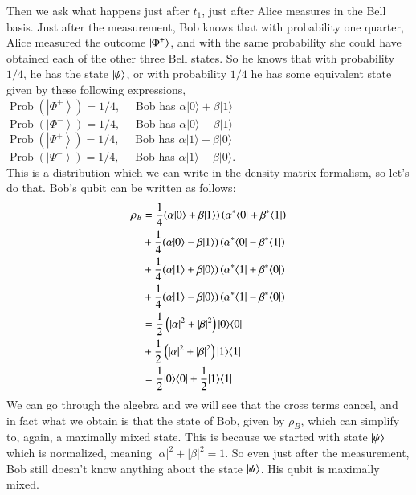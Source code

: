 Then we ask what happens just after $t_1$, just after Alice measures in the Bell basis. Just after the measurement, Bob knows that with probability one quarter, Alice measured the outcome $\left| \Phi^+ \right\rangle$, and with the same probability she could have obtained each of the other three  Bell states. So he knows that with probability $1/4$, he has the state $\left| \psi \right\rangle$, or with probability $1/4$ he has some equivalent state given by these following expressions,\\
$\operatorname{Prob}\left(\left|\Phi^{+}\right\rangle\right)=1 / 4, \quad$ Bob has $\alpha|0\rangle+\beta|1\rangle$\\
$\operatorname{Prob}\left(\left|\Phi^{-}\right\rangle\right)=1 / 4, \quad$ Bob has $\alpha|0\rangle-\beta|1\rangle$\\
$\operatorname{Prob}\left(\left|\Psi^{+}\right\rangle\right)=1 / 4, \quad$ Bob has $\alpha|1\rangle+\beta|0\rangle$\\
$\operatorname{Prob}\left(\left|\Psi^{-}\right\rangle\right)=1 / 4, \quad$ Bob has $\alpha|1\rangle-\beta|0\rangle$.\\

This is a distribution which we can write in the density matrix formalism, so let's do that. Bob's qubit can be written as follows:
\begin{equation}
\begin{aligned}
\rho_B &=\frac{1}{4}(\alpha|0\rangle+\beta|1\rangle)\left(\alpha^*\langle 0|+\beta^*\langle 1|\right) \\
&+\frac{1}{4}(\alpha|0\rangle-\beta|1\rangle)\left(\alpha^*\langle 0|-\beta^*\langle 1|\right) \\
&+\frac{1}{4}(\alpha|1\rangle+\beta|0\rangle)\left(\alpha^*\langle 1|+\beta^*\langle 0|\right) \\
&+\frac{1}{4}(\alpha|1\rangle-\beta|0\rangle)\left(\alpha^*\langle 1|-\beta^*\langle 0|\right) \\
&=\frac{1}{2}\left(|\alpha|^2+|\beta|^2\right)|0 \rangle \langle 0| \\
&+\frac{1}{2}\left(|\alpha|^2+|\beta|^2\right)|1 \rangle \langle 1| \\
&=\frac{1}{2}|0 \rangle \langle 0|+\frac{1}{2}|1 \rangle \langle 1|
\end{aligned}
\end{equation}
We can go through the algebra and we will see that the cross terms cancel, and in fact what we obtain is that the state of Bob, given by $\rho_B$, which can simplify to, again, a maximally mixed state. This is because we started with state $\left| \psi \right\rangle$ which is normalized, meaning $|\alpha|^2+|\beta|^2 = 1$. So even just after the measurement, Bob still doesn't know anything about the state $\left| \psi \right\rangle$. His qubit is maximally mixed.

